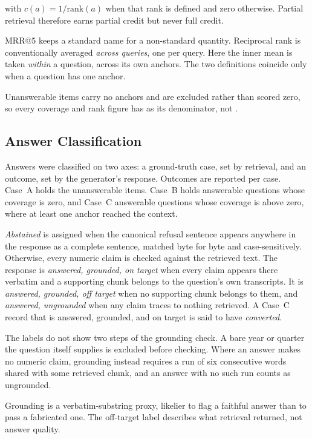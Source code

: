 \noindent
with $c(a) = 1/\mathrm{rank}(a)$ when that rank is defined and zero otherwise.
Partial retrieval therefore earns partial credit but never full credit.

MRR@5 keeps a standard name for a non-standard quantity. Reciprocal rank is
conventionally averaged \emph{across queries}, one per query. Here the inner
mean is taken \emph{within} a question, across its own anchors. The two
definitions coincide only when a question has one anchor.

Unanswerable items carry no anchors and are excluded rather than scored zero, so
every coverage and rank figure has \thesisNumQuestionsScored{} as its
denominator, not \thesisNumQuestions{}.

\subsection{Answer Classification}

Answers were classified on two axes: a ground-truth case, set by retrieval, and
an outcome, set by the generator's response. Outcomes are reported per case. Case~A holds the \thesisNumQuestionsUnanswerable{} unanswerable items.
Case~B holds answerable questions whose coverage is zero, and Case~C answerable
questions whose coverage is above zero, where at least one anchor reached the
context.

\emph{Abstained} is assigned when the canonical refusal sentence appears
anywhere in the response as a complete sentence, matched byte for byte and
case-sensitively. Otherwise, every numeric claim is checked against the
retrieved text. The response is \emph{answered, grounded, on target} when every
claim appears there verbatim and a supporting chunk belongs to the question's
own transcripts. It is \emph{answered, grounded, off target} when no supporting
chunk belongs to them, and \emph{answered, ungrounded} when any claim traces to
nothing retrieved. A Case~C record that is answered, grounded, and on target is said to
have \emph{converted}.

The labels do not show two steps of the grounding check. A bare year or quarter the
question itself supplies is excluded before checking. Where an answer makes no
numeric claim, grounding instead requires a run of six consecutive words shared
with some retrieved chunk, and an answer with no such run counts as ungrounded.

Grounding is a verbatim-substring proxy, likelier to flag a faithful answer than
to pass a fabricated one. The off-target label describes what retrieval
returned, not answer quality.

